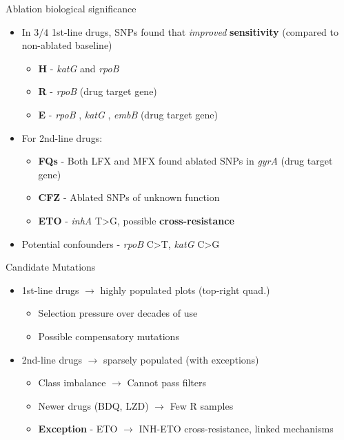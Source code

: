 \documentclass[pdf]{beamer} %
\begin{document}
\begin{frame}{Ablation biological significance}
  \begin{itemize}
    \item In $3/4$ 1st-line drugs, SNPs found that \textit{improved} \textbf{sensitivity} (compared to non-ablated baseline)
      \begin{itemize}
        \item \textbf{H} - \textit{katG} and \textit{rpoB} 
        \item \textbf{R} - \textit{rpoB} (drug target gene)
        \item \textbf{E} - \textit{rpoB} , \textit{katG} , \textit{embB} (drug target gene)
      \end{itemize}
    \item For 2nd-line drugs:
      \begin{itemize}
        \item \textbf{FQs} - Both LFX and MFX found ablated SNPs in \textit{gyrA} (drug target gene)
        \item \textbf{CFZ} - Ablated SNPs of unknown function 
        \item \textbf{ETO} - \textit{inhA} T>G, possible \textbf{cross-resistance} 
      \end{itemize}
    \item Potential confounders - \textit{rpoB} C>T, \textit{katG} C>G 
      \end{itemize}
\end{frame}

\begin{frame}{Candidate Mutations}
  \begin{itemize}
    \item 1st-line drugs $\rightarrow$ highly populated plots (top-right quad.)
      \begin{itemize}
        \item Selection pressure over decades of use
        \item Possible compensatory mutations 
      \end{itemize}
    \item 2nd-line drugs $\rightarrow$ sparsely populated (with exceptions)
      \begin{itemize}
        \item Class imbalance $\rightarrow$ Cannot pass filters
        \item Newer drugs (BDQ, LZD) $\rightarrow$ Few R samples
        \item \textbf{Exception} - ETO $\rightarrow$ INH-ETO cross-resistance, linked mechanisms
      \end{itemize}
  \end{itemize}
\end{frame}
\end{document}
